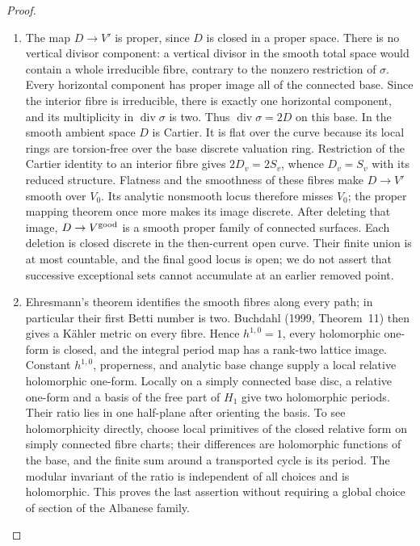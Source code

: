 \begin{proof}
\begin{enumerate}[label=\arabic*.,leftmargin=*]
\item The map \(D\to V'\) is proper, since \(D\) is closed in a proper
space. There is no vertical divisor component: a vertical divisor in
the smooth total space would contain a whole irreducible fibre,
contrary to the nonzero restriction of \(\sigma\). Every horizontal
component has proper image all of the connected base. Since the
interior fibre is irreducible, there is exactly one horizontal
component, and its multiplicity in \(\operatorname{div}\sigma\) is
two. Thus \(\operatorname{div}\sigma=2D\) on this base. In the smooth
ambient space \(D\) is Cartier. It is flat over the curve because
its local rings are torsion-free over the base discrete valuation
ring. Restriction of the Cartier identity to an interior fibre gives
\(2D_v=2S_v\), whence \(D_v=S_v\) with its reduced structure.
Flatness and the smoothness of these fibres make \(D\to V'\) smooth
over \(V_0\). Its analytic nonsmooth locus therefore misses \(V_0\);
the proper mapping theorem once more makes its image discrete.
After deleting that image, \(D\to V^{\rm good}\) is a smooth proper
family of connected surfaces. Each deletion is closed discrete in the
then-current open curve. Their finite union is at most countable,
and the final good locus is open; we do not assert that successive
exceptional sets cannot accumulate at an earlier removed point.

\item Ehresmann's theorem identifies the smooth fibres along every path;
in particular their first Betti number is two. Buchdahl (1999,
Theorem~11) then gives a K\"ahler metric on every fibre. Hence
\(h^{1,0}=1\), every holomorphic one-form is closed, and the integral
period map has a rank-two lattice image. Constant \(h^{1,0}\),
properness, and analytic base change supply a local relative
holomorphic one-form. Locally on a simply connected
base disc, a relative one-form and a basis of the free part of
\(H_1\) give two holomorphic periods. Their ratio lies in one
half-plane after orienting the basis. To see holomorphicity directly,
choose local primitives of the closed relative form on simply
connected fibre charts; their differences are holomorphic functions
of the base, and the finite sum around a transported cycle is its
period. The modular invariant of the ratio is independent of all
choices and is holomorphic. This proves the last assertion without
requiring a global choice of section of the Albanese family.
\end{enumerate}
\end{proof}

